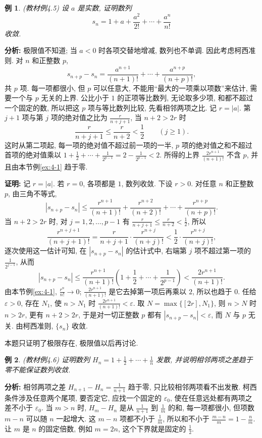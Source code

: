 \documentclass[UTF8,openany]{ctexbook}
\theoremstyle{chinesetextbook}
\newtheorem{example}{例}[section]
\newenvironment{cnproof}{\par\indent\textbf{证明:} \ignorespaces}{\par}
\begin{document}
\begin{example}\label{ex:4-5}
\textnormal{(教材例4.5)} 设 $a$ 是实数, 证明数列
\[
s_n=1+a+\frac{a^2}{2!}+\cdots+\frac{a^n}{n!}
\]
收敛.
\end{example}
\par\indent\textbf{分析:} 极限值不知道; 当 $a<0$ 时各项交替地增减, 数列也不单调. 因此考虑柯西准则. 对 $n$ 和正整数 $p$,
\[
s_{n+p}-s_n=\frac{a^{n+1}}{(n+1)!}+\cdots+\frac{a^{n+p}}{(n+p)!},
\]
共 $p$ 项. 每一项都很小, 但 $p$ 可以任意大, 不能用“最大的一项乘以项数”来估计, 需要一个与 $p$ 无关的上界. 公比小于 $1$ 的正项等比数列, 无论取多少项, 和都不超过一个固定的数, 所以把这 $p$ 项与等比数列比较, 先看相邻两项之比. 记 $r=|a|$. 第 $j+1$ 项与第 $j$ 项的绝对值之比为 $\displaystyle\frac r{n+j+1}$, 当 $n+2>2r$ 时
\[
\frac r{n+j+1}\le\frac r{n+2}<\frac12\qquad(j\ge1).
\]
这时从第二项起, 每一项的绝对值不超过前一项的一半, $p$ 项的绝对值之和不超过首项的绝对值乘以 $\displaystyle1+\frac12+\cdots+\frac1{2^{p-1}}=2-\frac1{2^{p-1}}<2$. 所得的上界 $\displaystyle\frac{2r^{n+1}}{(n+1)!}$ 不含 $p$, 并且由本节例\ref{ex:4-1} 趋于零.
\begin{cnproof}
记 $r=|a|$. 若 $r=0$, 各项都是 $1$, 数列收敛. 下设 $r>0$. 对任意 $n$ 和正整数 $p$, 由三角不等式,
\[
|s_{n+p}-s_n|\le\frac{r^{n+1}}{(n+1)!}+\frac{r^{n+2}}{(n+2)!}+\cdots+\frac{r^{n+p}}{(n+p)!}.
\]
当 $n+2>2r$ 时, 对 $j=1,2,\ldots,p-1$ 有 $\displaystyle\frac r{n+j+1}\le\frac r{n+2}<\frac12$, 所以
\[
\frac{r^{n+j+1}}{(n+j+1)!}=\frac r{n+j+1}\cdot\frac{r^{n+j}}{(n+j)!}<\frac12\cdot\frac{r^{n+j}}{(n+j)!},
\]
逐次使用这一估计可知, 在 $|s_{n+p}-s_n|$ 的估计式中, 右端第 $j$ 项不超过第一项的 $\displaystyle\frac1{2^{j-1}}$, 从而
\[
|s_{n+p}-s_n|\le\frac{r^{n+1}}{(n+1)!}\left(1+\frac12+\cdots+\frac1{2^{p-1}}\right)<\frac{2r^{n+1}}{(n+1)!}.
\]
由本节例\ref{ex:4-1}, $\displaystyle\frac{r^n}{n!}\to0$; $\displaystyle\frac{2r^{n+1}}{(n+1)!}$ 是它去掉第一项后再乘以 $2$, 所以也趋于 $0$. 任给 $\varepsilon>0$, 存在 $N_1$, 使 $n>N_1$ 时 $\displaystyle\frac{2r^{n+1}}{(n+1)!}<\varepsilon$. 取 $N=\max\{[2r],N_1\}$, 则 $n>N$ 时 $n>2r$, 更有 $n+2>2r$, 于是对一切正整数 $p$ 都有 $|s_{n+p}-s_n|<\varepsilon$, 而 $N$ 与 $p$ 无关. 由柯西准则, $\{s_n\}$ 收敛.
\end{cnproof}
本题只证明了极限存在, 极限值以后再讨论.
\begin{example}\label{ex:4-6}
\textnormal{(教材例4.6)} 证明数列 $\displaystyle H_n=1+\frac12+\cdots+\frac1n$ 发散, 并说明相邻两项之差趋于零不能保证数列收敛.
\end{example}
\par\indent\textbf{分析:} 相邻两项之差 $\displaystyle H_{n+1}-H_n=\frac1{n+1}$ 趋于零, 只比较相邻两项看不出发散. 柯西条件涉及任意两个尾项, 要否定它, 应找一个固定的 $\varepsilon_0$, 使在任意远处都有两项之差不小于 $\varepsilon_0$. 当 $m>n$ 时, $H_m-H_n$ 是从 $\displaystyle\frac1{n+1}$ 到 $\displaystyle\frac1m$ 的和, 每一项都很小, 但项数 $m-n$ 可以随 $n$ 一起增大. 这 $m-n$ 项都不小于 $\displaystyle\frac1m$, 所以和不小于 $\displaystyle\frac{m-n}m=1-\frac nm$. 让 $m$ 是 $n$ 的固定倍数, 例如 $m=2n$, 这个下界就是固定的 $\displaystyle\frac12$.
\end{document}
